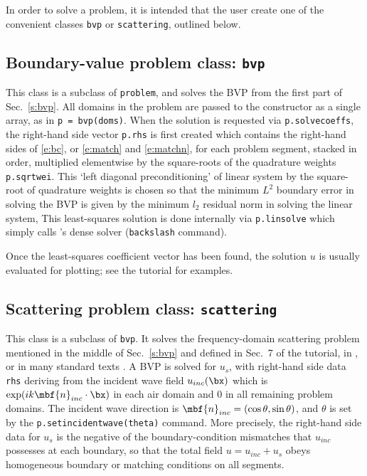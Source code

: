 \documentclass[12pt]{article}
\begin{document}
In order to solve a problem, it is intended that the user create one of the
convenient classes {\tt bvp} or {\tt scattering}, outlined below.


\subsection{Boundary-value problem class: {\tt bvp}}

This class is a subclass of {\tt problem}, and solves
the BVP from the first part of Sec.~\ref{s:bvp}.
All domains in the problem are passed to the constructor
as a single array, as in {\tt p = bvp(doms)}.
When the solution is requested via {\tt p.solvecoeffs}, 
the right-hand side vector {\tt p.rhs} is first created which
contains the right-hand sides of \eqref{e:bc}, or \eqref{e:match} and
\eqref{e:matchn}, for each problem segment, stacked in order,
multiplied elementwise
by the square-roots of the quadrature weights {\tt p.sqrtwei}.
This `left diagonal preconditioning' of linear system
by the square-root of quadrature weights is chosen so that
the minimum $L^2$ boundary error in solving the BVP is
given by the minimum $l_2$ residual norm in solving the linear system,
This least-squares solution is done internally via {\tt p.linsolve}
which simply calls \matlab's dense solver ({\tt backslash} command).

Once the least-squares coefficient vector has been found, the
solution $u$ is usually evaluated for plotting; see the tutorial for examples.



\subsection{Scattering problem class: {\tt scattering}}

This class is a subclass of {\tt bvp}.
It solves the frequency-domain
scattering problem mentioned in the middle of Sec.~\ref{s:bvp}
and defined in Sec.~7 of the tutorial, in \cite{polygonscatt},
or in many standard texts \cite{coltonkress}.
A BVP is solved for $u_s$, with right-hand side data {\tt rhs} deriving
from the incident wave field $u_{inc}(\bx)$
which is $\exp(ik \mbf{n}_{inc} \cdot \bx)$ in each air domain
and 0 in all remaining problem domains.
The incident wave direction is $\mbf{n}_{inc} = (\cos \theta,\sin \theta)$,
and $\theta$ is set by the {\tt p.setincidentwave(theta)} command.
More precisely, the right-hand side data for $u_s$ is
the negative of the boundary-condition mismatches that $u_{inc}$
possesses at each boundary, so that the total field $u=u_{inc}+u_s$ obeys
homogeneous boundary or matching conditions on all segments.
\end{document}

